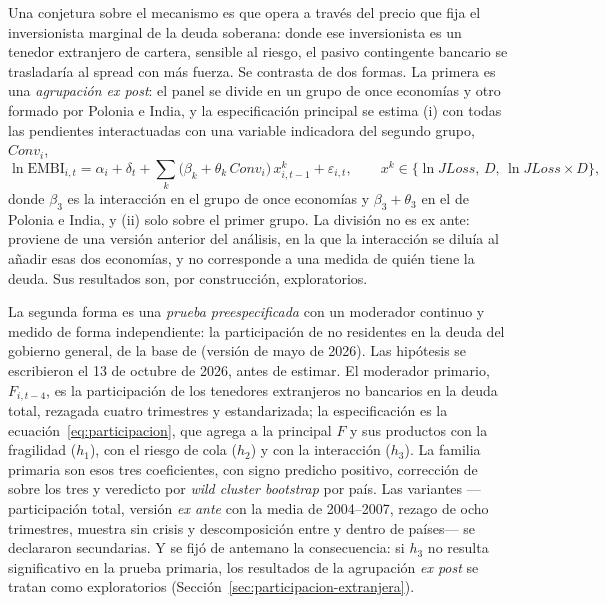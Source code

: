 Una conjetura sobre el mecanismo es que opera a través del precio que fija el inversionista marginal de la deuda soberana: donde ese inversionista es un tenedor extranjero de cartera, sensible al riesgo, el pasivo contingente bancario se trasladaría al spread con más fuerza. Se contrasta de dos formas. La primera es una \emph{agrupación ex post}: el panel se divide en un grupo de once economías y otro formado por Polonia e India, y la especificación principal se estima (i) con todas las pendientes interactuadas con una variable indicadora del segundo grupo, $Conv_i$,
\begin{equation}
\ln\mathrm{EMBI}_{i,t}=\alpha_i+\delta_t+\sum_{k}\bigl(\beta_k+\theta_k\,Conv_i\bigr)\,x^{k}_{i,t-1}+\varepsilon_{i,t},\qquad x^{k}\in\{\ln JLoss,\,D,\,\ln JLoss\times D\},
\label{eq:heterogeneidad}
\end{equation}
donde $\beta_3$ es la interacción en el grupo de once economías y $\beta_3+\theta_3$ en el de Polonia e India, y (ii) solo sobre el primer grupo. La división no es ex ante: proviene de una versión anterior del análisis, en la que la interacción se diluía al añadir esas dos economías, y no corresponde a una medida de quién tiene la deuda. Sus resultados son, por construcción, exploratorios.

La segunda forma es una \emph{prueba preespecificada} con un moderador continuo y medido de forma independiente: la participación de no residentes en la deuda del gobierno general, de la base de \citet{ArslanalpTsuda2014} (versión de mayo de 2026). Las hipótesis se escribieron el 13 de octubre de 2026, antes de estimar. El moderador primario, $F_{i,t-4}$, es la participación de los tenedores extranjeros no bancarios en la deuda total, rezagada cuatro trimestres y estandarizada; la especificación es la ecuación~\eqref{eq:participacion}, que agrega a la principal $F$ y sus productos con la fragilidad ($h_1$), con el riesgo de cola ($h_2$) y con la interacción ($h_3$). La familia primaria son esos tres coeficientes, con signo predicho positivo, corrección de \citet{Holm1979} sobre los tres y veredicto por \textit{wild cluster bootstrap} por país. Las variantes ---participación total, versión \textit{ex ante} con la media de 2004--2007, rezago de ocho trimestres, muestra sin crisis y descomposición entre y dentro de países--- se declararon secundarias. Y se fijó de antemano la consecuencia: si $h_3$ no resulta significativo en la prueba primaria, los resultados de la agrupación \textit{ex post} se tratan como exploratorios (Sección~\ref{sec:participacion-extranjera}).

